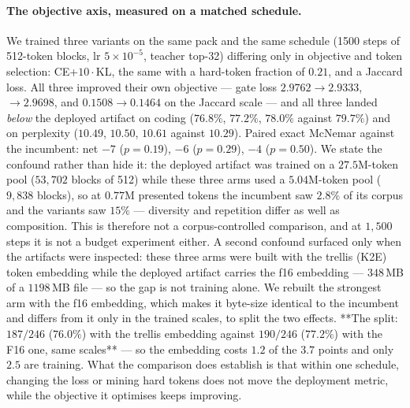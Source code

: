 \documentclass[11pt,a4paper]{article}
\begin{document}
\paragraph{The objective axis, measured on a matched schedule.} We trained three variants on the
same pack and the same schedule (1500 steps of 512-token blocks, lr $5\times10^{-5}$, teacher
top-32) differing only in objective and token selection: CE+$10\cdot$KL, the same with a hard-token
fraction of $0.21$, and a Jaccard loss. All three improved their own objective --- gate loss
$2.9762\to2.9333$, $\to2.9698$, and $0.1508\to0.1464$ on the Jaccard scale --- and all three landed
\emph{below} the deployed artifact on coding ($76.8\%$, $77.2\%$, $78.0\%$ against $79.7\%$) and on
perplexity ($10.49$, $10.50$, $10.61$ against $10.29$). Paired exact McNemar against the incumbent:
net $-7$ ($p=0.19$), $-6$ ($p=0.29$), $-4$ ($p=0.50$). We state the confound rather than hide it:
the deployed artifact was trained on a $27.5$M-token pool ($53{,}702$ blocks of 512) while these
three arms used a $5.04$M-token pool ($9{,}838$ blocks), so at $0.77$M presented tokens the
incumbent saw $2.8\%$ of its corpus and the variants saw $15\%$ --- diversity and repetition differ
as well as composition. This is therefore not a corpus-controlled comparison, and at $1{,}500$
steps it is not a budget experiment either. A second confound surfaced only when the artifacts
were inspected: these three arms were built with the trellis (K2E) token embedding while the
deployed artifact carries the f16 embedding --- $348$\,MB of a $1198$\,MB file --- so the gap is not
training alone. We rebuilt the strongest arm with the f16 embedding, which makes it byte-size
identical to the incumbent and differs from it only in the trained scales, to split the two
effects. **The split: $187/246$ ($76.0\%$) with the trellis embedding against $190/246$ ($77.2\%$) with
the F16 one, same scales** --- so the embedding costs $1.2$ of the $3.7$ points and only $2.5$ are
training. What the comparison does establish
is that within one schedule, changing the loss or mining hard tokens does not move the deployment
metric, while the objective it optimises keeps improving.
\end{document}
